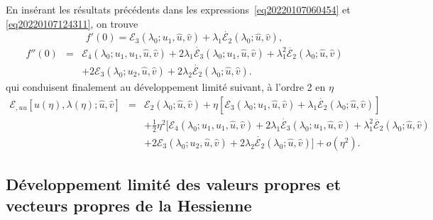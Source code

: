 \documentclass[12pt, final]{amsart}
\begin{document}
En ins{\'e}rant les r{\'e}sultats pr{\'e}c{\'e}dents dans les
expressions~\eqref{eq20220107060454} et \eqref{eq20220107124311}, on trouve
\begin{equation}
  f' (0) =\mathcal{E}_3 (\lambda_0 ; u_1, \hat{u}, \hat{v}) + \lambda_1
  \dot{\mathcal{E}_2} (\lambda_0 ; \hat{u}, \hat{v}),
\end{equation}
\begin{eqnarray}
  f'' (0) & = & \mathcal{E}_4 (\lambda_0 ; u_1, u_1, \hat{u}, \hat{v}) + 2
  \lambda_1  \dot{\mathcal{E}_3} (\lambda_0 ; u_1, \hat{u}, \hat{v}) +
  \lambda_1^2  \ddot{\mathcal{E}_2} (\lambda_0 ; \hat{u}, \hat{v}) \nonumber\\
  &  &  + 2\mathcal{E}_3 (\lambda_0 ; u_2, \hat{u}, \hat{v}) + 2
  \lambda_2  \dot{\mathcal{E}_2} (\lambda_0 ; \hat{u}, \hat{v}) .
\end{eqnarray}
qui conduisent finalement au d{\'e}veloppement limit{\'e} suivant, {\`a}
l'ordre 2 en $\eta$
\begin{eqnarray}
  \mathcal{E}_{, u  u} [u (\eta), \lambda (\eta) ; \hat{u}, \hat{v}] &
  = & \mathcal{E}_2 (\lambda_0 ; \hat{u}, \hat{v}) + \eta [\mathcal{E}_3
  (\lambda_0 ; u_1, \hat{u}, \hat{v})   + \lambda_1
  \dot{\mathcal{E}_2} (\lambda_0 ; \hat{u}, \hat{v})] \nonumber\\
  &  &  + \tfrac{1}{2} \eta^2  [\mathcal{E}_4 (\lambda_0 ; u_1, u_1,
  \hat{u}, \hat{v})  + 2 \lambda_1  \dot{\mathcal{E}_3} (\lambda_0 ;
  u_1, \hat{u}, \hat{v}) + \lambda_1^2  \ddot{\mathcal{E}_2} (\lambda_0 ;
  \hat{u}, \hat{v}) \nonumber\\
  &  &   + 2\mathcal{E}_3 (\lambda_0 ; u_2, \hat{u},
  \hat{v}) + 2 \lambda_2  \dot{\mathcal{E}_2} (\lambda_0 ; \hat{u}, \hat{v})]
  + o (\eta^2) .
\end{eqnarray}

\subsection{D{\'e}veloppement limit{\'e} des valeurs propres et vecteurs
propres de la Hessienne}
\end{document}
